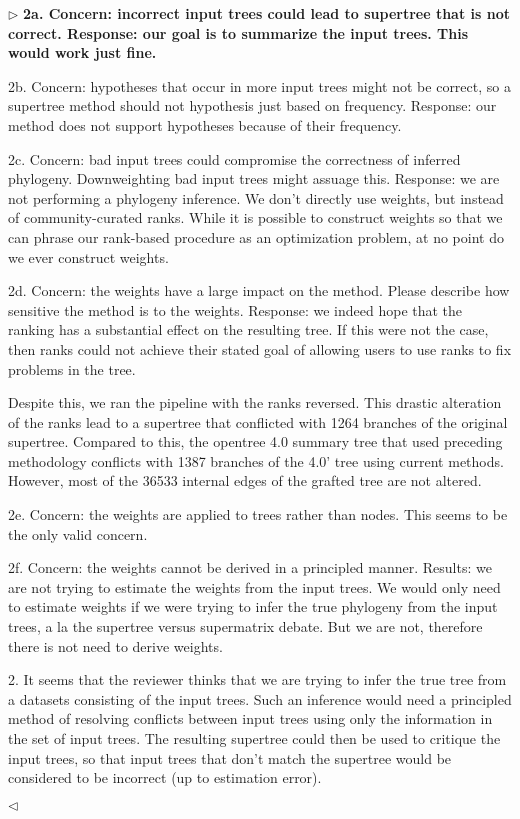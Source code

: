 \documentclass{article}
\newenvironment{reply}{$\triangleright$\bf}{$\triangleleft$}
\begin{document}
\begin{reply}
2a. Concern: incorrect input trees could lead to supertree that is not correct.  Response: our goal is to summarize the input trees.  This would work just fine.

2b. Concern: hypotheses that occur in more input trees might not be correct, so a supertree method should not hypothesis just based on frequency.  Response: our method does not support hypotheses because of their frequency.

2c. Concern: bad input trees could compromise the correctness of inferred phylogeny.  Downweighting bad input trees might assuage this.  Response: we are not performing a phylogeny inference.  We don't directly use weights, but instead of community-curated ranks.  While it is possible to construct weights so that we can phrase our rank-based procedure as an optimization problem, at no point do we ever construct weights.

2d. Concern: the weights have a large impact on the method.  Please describe how sensitive the method is to the weights.  Response: we indeed hope that the ranking has a substantial effect on the resulting tree.  If this were not the case, then ranks could not achieve their stated goal of allowing users to use ranks to fix problems in the tree.

Despite this, we ran the pipeline with the ranks reversed.  This drastic alteration of the ranks lead to a supertree that conflicted with 1264 branches of the original supertree.  Compared to this, the opentree 4.0 summary tree that used preceding methodology conflicts with 1387 branches of the 4.0’ tree using current methods.  However, most of the 36533 internal edges of the grafted tree are not altered. 

2e. Concern: the weights are applied to trees rather than nodes.  This seems to be the only valid concern.

2f. Concern: the weights cannot be derived in a principled manner.  Results: we are not trying to estimate the weights from the input trees.  We would only need to estimate weights if we were trying to infer the true phylogeny from the input trees, a la the supertree versus supermatrix debate.  But we are not, therefore there is not need to derive weights.

2.  It seems that the reviewer thinks that we are trying to infer the true tree from a datasets consisting of the input trees.  Such an inference would need a principled method of resolving conflicts between input trees using only the information in the set of input trees.  The resulting supertree could then be used to critique the input trees, so that input trees that don't match the supertree would be considered to be incorrect (up to estimation error).


\end{reply}
\end{document}
